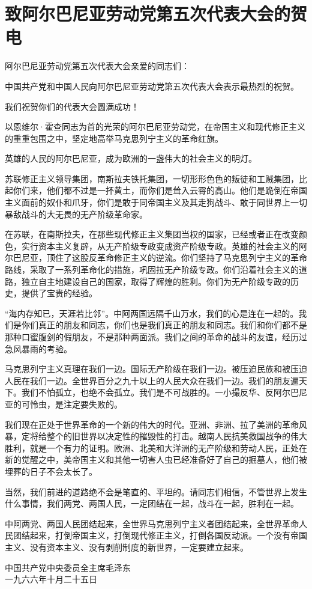 \section[致阿尔巴尼亚劳动党第五次代表大会的贺电（一九六六年十月二十五日）]{致阿尔巴尼亚劳动党第五次代表大会的贺电}


阿尔巴尼亚劳动党第五次代表大会亲爱的同志们：

中国共产党和中国人民向阿尔巴尼亚劳动党第五次代表大会表示最热烈的祝贺。

我们祝贺你们的代表大会圆满成功！

以恩维尔·霍查同志为首的光荣的阿尔巴尼亚劳动党，在帝国主义和现代修正主义的重重包围之中，坚定地高举马克思列宁主义的革命红旗。

英雄的人民的阿尔巴尼亚，成为欧洲的一盏伟大的社会主义的明灯。

苏联修正主义领导集团，南斯拉夫铁托集团，一切形形色色的叛徒和工贼集团，比起你们来，他们都不过是一抔黄土，而你们是耸入云霄的高山。他们是跪倒在帝国主义面前的奴仆和爪牙，你们是敢于同帝国主义及其走狗战斗、敢于同世界上一切暴敌战斗的大无畏的无产阶级革命家。

在苏联，在南斯拉夫，在那些现代修正主义集团当权的国家，已经或者正在改变颜色，实行资本主义复辟，从无产阶级专政变成资产阶级专政。英雄的社会主义的阿尔巴尼亚，顶住了这股反革命修正主义的逆流。你们坚持了马克思列宁主义的革命路线，采取了一系列革命化的措施，巩固拉无产阶级专政。你们沿着社会主义的道路，独立自主地建设自己的国家，取得了辉煌的胜利。你们为无产阶级专政的历史，提供了宝贵的经验。

“海内存知已，天涯若比邻”。中阿两国远隔千山万水，我们的心是连在一起的。我们是你们真正的朋友和同志，你们也是我们真正的朋友和同志。我们和你们都不是那种口蜜腹剑的假朋友，不是那种两面派。我们之间的革命的战斗的友谊，经历过急风暴雨的考验。

马克思列宁主义真理在我们一边。国际无产阶级在我们一边。被压迫民族和被压迫人民在我们一边。全世界百分之九十以上的人民大众在我们一边。我们的朋友遍天下。我们不怕孤立，也绝不会孤立。我们是不可战胜的。一小撮反华、反阿尔巴尼亚的可怜虫，是注定要失败的。

我们现在正处于世界革命的一个新的伟大的时代。亚洲、非洲、拉了美洲的革命风暴，定将给整个的旧世界以决定性的摧毁性的打击。越南人民抗美救国战争的伟大胜利，就是一个有力的证明。欧洲、北美和大洋洲的无产阶级和劳动人民，正处在新的觉醒之中，美帝国主义和其他一切害人虫已经准备好了自己的掘墓人，他们被埋葬的日子不会太长了。

当然，我们前进的道路绝不会是笔直的、平坦的。请同志们相信，不管世界上发生什么事情，我们两党、两国人民，一定团结在一起，战斗在一起，胜利在一起。

中阿两党、两国人民团结起来，全世界马克思列宁主义者团结起来，全世界革命人民团结起来，打倒帝国主义，打倒现代修正主义，打倒各国反动派。一个没有帝国主义、没有资本主义、没有剥削制度的新世界，一定要建立起来。

{\raggedleft 中国共产党中央委员全主席毛泽东\\一九六六年十月二十五日\par}


